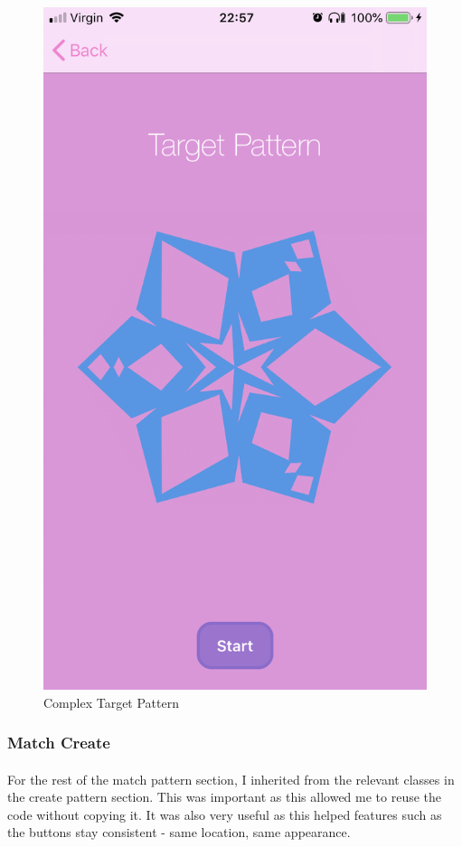 \documentclass[11pt]{article}
\begin{document}
\begin{figure}[!ht]
\begin{minipage}{0.45\textwidth}
                            \includegraphics[width=0.7\linewidth]{KiriZen/complexTarget.png}
                            \caption{Complex Target Pattern}
                            \label{fig:kiriZen-complexTarget}
                        \end{minipage}
                    \end{figure}
                    
        \subsubsection{Match Create}
            \paragraph{}
            For the rest of the match pattern section, I inherited from the relevant classes in the create pattern section. This was important as this allowed me to reuse the code without copying it. It was also very useful as this helped features such as the buttons stay consistent - same location, same appearance.
            
\end{document}
